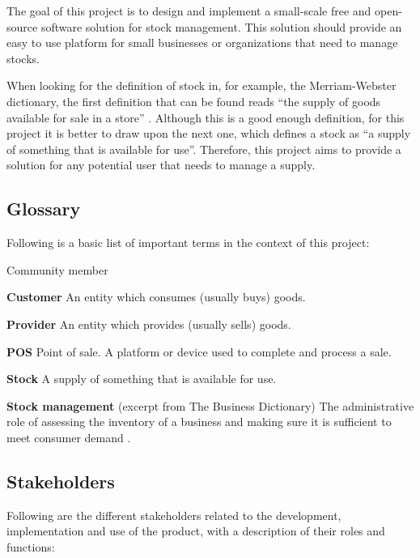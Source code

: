 The goal of this project is to design and implement a small-scale free and open-source software solution for stock management. This solution should provide an easy to use platform for small businesses or organizations that need to manage stocks.

When looking for the definition of stock in, for example, the Merriam-Webster dictionary, the first definition that can be found reads “the supply of goods available for sale in a store” \cite{1}. Although this is a good enough definition, for this project it is better to draw upon the next one, which defines a stock as “a supply of something that is available for use”. Therefore, this project aims to provide a solution for any potential user that needs to manage a supply.

\subsection{Glossary}
Following is a basic list of important terms in the context of this project:

\begin{labeling}{Community member}
\item[\textbf{Customer}]{An entity which consumes (usually buys) goods.}
\item[\textbf{Provider}]{An entity which provides (usually sells) goods.}
\item[\textbf{POS}]{Point of sale. A platform or device used to complete and process a sale.}
\item[\textbf{Stock}]{A supply of something that is available for use.}
\item[\textbf{Stock management}]{(excerpt from The Business Dictionary) The administrative role of assessing the inventory of a business and making sure it is sufficient to meet consumer demand \cite{2}.}
\end{labeling}

\subsection{Stakeholders}
Following are the different stakeholders related to the development, implementation and use of the product, with a description of their roles and functions:

